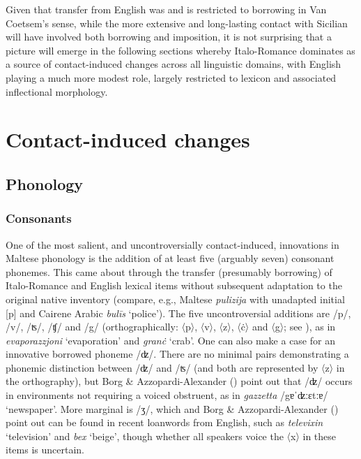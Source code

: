 \documentclass[output=paper]{langsci/langscibook}
\begin{document}
Given that transfer from English was and is restricted to borrowing in Van Coetsem's sense, while the more extensive and long-lasting contact with Sicilian will have involved both borrowing and imposition, it is not surprising that a picture will emerge in the following sections whereby Italo-Romance dominates as a source of contact-induced changes across all linguistic domains, with English playing a much more modest role, largely restricted to lexicon and associated inflectional morphology.

\section{Contact-induced changes
}
\subsection{Phonology\footnotemark}
\subsubsection{Consonants} %
\label{sec:311}%
One of the most salient, and uncontroversially contact-induced, innovations in Maltese phonology is the addition of at least five (arguably seven) consonant phonemes. This came about through the transfer (presumably borrowing) of Italo-Romance and English lexical items without subsequent adaptation to the original native inventory (compare, e.g., Maltese \textit{pulizija} with unadapted initial [p] and Cairene Arabic \textit{bul\={i}s} `police'). The five uncontroversial additions are /p/, /v/, /ʦ/, /ʧ/ and /g/ (orthographically: 〈p〉, 〈v〉, 〈z〉, 〈ċ〉 and 〈g〉; see ), as in \textit{evaporazzjoni} `evaporation' and \textit{granċ} `crab'. One can also make a case for an innovative borrowed phoneme /ʣ/. There are no minimal pairs demonstrating a phonemic distinction between /ʣ/ and /ʦ/ (and both are represented by 〈z〉 in the orthography), but Borg \& Azzopardi-Alexander (\citeyear[301]{BorgAzzopardi-Alexander1997}) point out that /ʣ/ occurs in environments not requiring a voiced obstruent, as in \textit{gazzetta} /gɐˈʣːɛtːɐ/ `newspaper'. More marginal is /ʒ/, which \citet{mifsud2011} and Borg \& Azzopardi-Alexander (\citeyear[303]{BorgAzzopardi-Alexander1997}) point out can be found in recent loanwords from English, such as \textit{televixin} `television' and \textit{bex} `beige', though whether all speakers voice the 〈x〉 in these items is uncertain.
\end{document}
